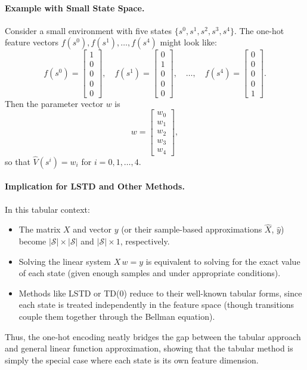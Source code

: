 \paragraph{Example with Small State Space.}
Consider a small environment with five states $\{s^0, s^1, s^2, s^3, s^4\}$. The one-hot feature vectors $f(s^0), f(s^1), \ldots, f(s^4)$ might look like:
\[
f(s^0) = 
\begin{bmatrix}
1 \\ 0 \\ 0 \\ 0 \\ 0
\end{bmatrix},\quad
f(s^1) = 
\begin{bmatrix}
0 \\ 1 \\ 0 \\ 0 \\ 0
\end{bmatrix},\quad
\ldots,\quad
f(s^4) = 
\begin{bmatrix}
0 \\ 0 \\ 0 \\ 0 \\ 1
\end{bmatrix}.
\]
Then the parameter vector $w$ is 
\[
w 
= 
\begin{bmatrix}
w_0 \\ w_1 \\ w_2 \\ w_3 \\ w_4
\end{bmatrix},
\]
so that $\hat{V}(s^i) = w_i$ for $i = 0,1,\ldots,4$.

\paragraph{Implication for LSTD and Other Methods.}
In this tabular context:
\begin{itemize}
    \item The matrix $X$ and vector $y$ (or their sample-based approximations $\widehat{X}$, $\widehat{y}$) become $\lvert \mathcal{S} \rvert \times \lvert \mathcal{S} \rvert$ and $\lvert \mathcal{S} \rvert \times 1$, respectively.
    \item Solving the linear system $X \, w = y$ is equivalent to solving for the exact value of each state (given enough samples and under appropriate conditions).
    \item Methods like LSTD or TD(0) reduce to their well-known tabular forms, since each state is treated independently in the feature space (though transitions couple them together through the Bellman equation).
\end{itemize}

Thus, the one-hot encoding neatly bridges the gap between the tabular approach and general linear function approximation, showing that the tabular method is simply the special case where each state is its own feature dimension.